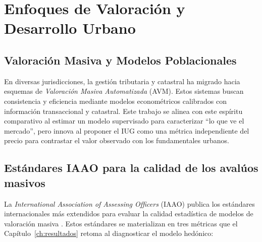 \documentclass[12pt, a4paper, twoside, openright]{report}
\theoremstyle{plain}
\theoremstyle{definition}
\newcommand{\IUG}{IUG}             %
\begin{document}
\section{Enfoques de Valoración y Desarrollo Urbano}

\subsection{Valoración Masiva y Modelos Poblacionales}
En diversas jurisdicciones, la gestión tributaria y catastral ha migrado hacia esquemas de \emph{Valoración Masiva Automatizada} (AVM). Estos sistemas buscan consistencia y eficiencia mediante modelos econométricos calibrados con información transaccional y catastral. Este trabajo se alinea con este espíritu comparativo al estimar un modelo supervisado para caracterizar ``lo que ve el mercado'', pero innova al proponer el \IUG{} como una métrica independiente del precio para contrastar el valor observado con los fundamentales urbanos.

\subsection{Estándares IAAO para la calidad de los avalúos masivos}
\label{subsec:iaao_estandares}

La \textit{International Association of Assessing Officers} (IAAO) publica los estándares internacionales más extendidos para evaluar la calidad estadística de modelos de valoración masiva \citep{iaao2013}. Estos estándares se materializan en tres métricas que el Capítulo~\ref{ch:resultados} retoma al diagnosticar el modelo hedónico:
\end{document}
